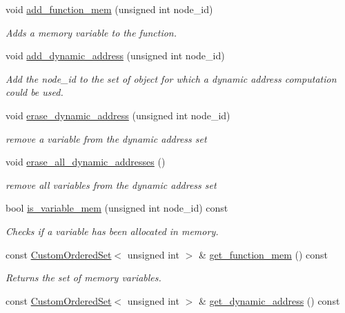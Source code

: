 \begin{DoxyCompactItemize}
void \hyperlink{classFunctionBehavior_a146cf313c71db7291e2a436498fe675e}{add\+\_\+function\+\_\+mem} (unsigned int node\+\_\+id)
\begin{DoxyCompactList}\small\item\em Adds a memory variable to the function. \end{DoxyCompactList}\item 
void \hyperlink{classFunctionBehavior_a6890e20207da48aac7666a7e9c1cf6cd}{add\+\_\+dynamic\+\_\+address} (unsigned int node\+\_\+id)
\begin{DoxyCompactList}\small\item\em Add the node\+\_\+id to the set of object for which a dynamic address computation could be used. \end{DoxyCompactList}\item 
void \hyperlink{classFunctionBehavior_abf565b14aa477638107ed1e11f20453f}{erase\+\_\+dynamic\+\_\+address} (unsigned int node\+\_\+id)
\begin{DoxyCompactList}\small\item\em remove a variable from the dynamic address set \end{DoxyCompactList}\item 
void \hyperlink{classFunctionBehavior_a0cda97f73fb62606acf987bf10232522}{erase\+\_\+all\+\_\+dynamic\+\_\+addresses} ()
\begin{DoxyCompactList}\small\item\em remove all variables from the dynamic address set \end{DoxyCompactList}\item 
bool \hyperlink{classFunctionBehavior_a63c7b45bb5c4d9d24d14ce19fc9f38cb}{is\+\_\+variable\+\_\+mem} (unsigned int node\+\_\+id) const
\begin{DoxyCompactList}\small\item\em Checks if a variable has been allocated in memory. \end{DoxyCompactList}\item 
const \hyperlink{classCustomOrderedSet}{Custom\+Ordered\+Set}$<$ unsigned int $>$ \& \hyperlink{classFunctionBehavior_a8fc387658e865ef562a851f0d4e95b98}{get\+\_\+function\+\_\+mem} () const
\begin{DoxyCompactList}\small\item\em Returns the set of memory variables. \end{DoxyCompactList}\item 
const \hyperlink{classCustomOrderedSet}{Custom\+Ordered\+Set}$<$ unsigned int $>$ \& \hyperlink{classFunctionBehavior_a47651145548f49e5609bb5bc90cb318e}{get\+\_\+dynamic\+\_\+address} () const

\end{DoxyCompactItemize}
